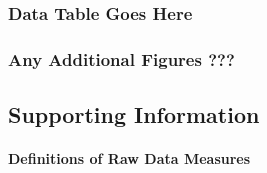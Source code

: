 \documentclass[]{article}
\let\oldparagraph\paragraph
\renewcommand{\paragraph}[1]{\oldparagraph{#1}\mbox{}}
\begin{document}
\subsubsection{\texorpdfstring{\textbf{Data Table Goes
Here}}{Data Table Goes Here}}\label{data-table-goes-here}

\subsubsection{Any Additional Figures ???}\label{any-additional-figures}

\subsection{\texorpdfstring{\textbf{Supporting
Information}}{Supporting Information}}\label{supporting-information}

\paragraph{Definitions of Raw Data
Measures}\label{definitions-of-raw-data-measures}
\end{document}
